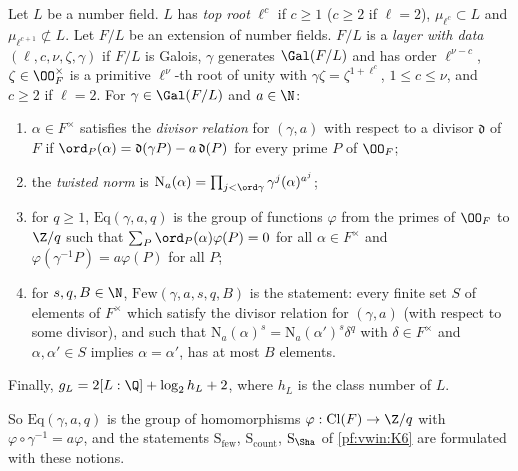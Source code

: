 \begin{definition}\label{pf:vwin:laydef}
Let $L$ be a number field. $L$ has \emph{top root} $\ell^c$ if $c\ge1$ ($c\ge2$ if $\ell=2$), $\mu_{\ell^c}\subset L$ and
$\mu_{\ell^{c+1}}\not\subset L$. Let $F/L$ be an extension of number fields. $F/L$ is a \emph{layer with data
$(\ell,c,\nu,\zeta,\gamma)$} if $F/L$ is Galois, $\gamma$ generates $\Gal(F/L)$ and has order $\ell^{\nu-c}$, $\zeta\in\OO_F^\times$
is a primitive $\ell^\nu$-th root of unity with $\gamma\zeta=\zeta^{1+\ell^c}$, $1\le c\le\nu$, and $c\ge2$ if $\ell=2$. For
$\gamma\in\Gal(F/L)$ and $a\in\N$:
\begin{enumerate}[label=(\alph*)]
\item $\alpha\in F^\times$ satisfies the \emph{divisor relation} for $(\gamma,a)$ with respect to a divisor $\mathfrak d$ of $F$ if
$\ord_P(\alpha)=\mathfrak d(\gamma P)-a\,\mathfrak d(P)$ for every prime $P$ of $\OO_F$;
\item the \emph{twisted norm} is $\mathrm N_a(\alpha)=\prod_{j<\ord\gamma}\gamma^j(\alpha)^{a^j}$;
\item for $q\ge1$, $\mathrm{Eq}(\gamma,a,q)$ is the group of functions $\varphi$ from the primes of $\OO_F$ to $\Z/q$ such that
$\sum_P\ord_P(\alpha)\varphi(P)=0$ for all $\alpha\in F^\times$ and $\varphi(\gamma^{-1}P)=a\varphi(P)$ for all $P$;
\item for $s,q,B\in\N$, $\mathrm{Few}(\gamma,a,s,q,B)$ is the statement: every finite set $S$ of elements of $F^\times$ which
satisfy the divisor relation for $(\gamma,a)$ (with respect to some divisor), and such that $\mathrm N_a(\alpha)^s=\mathrm
N_a(\alpha')^s\delta^q$ with $\delta\in F^\times$ and $\alpha,\alpha'\in S$ implies $\alpha=\alpha'$, has at most $B$ elements.
\end{enumerate}
Finally, $g_L=2[L:\Q]+\log_2h_L+2$, where $h_L$ is the class number of $L$.
\end{definition}

So $\mathrm{Eq}(\gamma,a,q)$ is the group of homomorphisms $\varphi:\mathrm{Cl}(F)\to\Z/q$ with $\varphi\circ\gamma^{-1}=a\varphi$,
and the statements $\mathrm S_{\mathrm{few}}$, $\mathrm S_{\mathrm{count}}$, $\mathrm S_\Sha$ of \ref{pf:vwin:K6} are
formulated with these notions.

